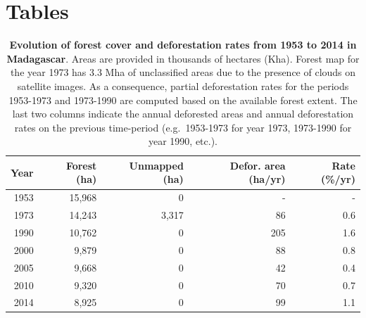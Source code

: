 \documentclass[a4paper, 12pt, leqno]{article} %
\begin{document}
\newpage

\section{Tables}
\label{tables}

\nopagebreak

\vfill
\begin{table}[!h]
  \begin{longtable}[]{@{}rrrrr@{}}
    \toprule
    Year & Forest (ha) & Unmapped (ha) & Defor. area (ha/yr) & Rate
    (\%/yr) \\
    \midrule
    \endhead
    1953 & 15,968 & 0 & - & - \\
    1973 & 14,243 & 3,317 & 86 & 0.6 \\
    1990 & 10,762 & 0 & 205 & 1.6 \\
    2000 & 9,879 & 0 & 88 & 0.8 \\
    2005 & 9,668 & 0 & 42 & 0.4 \\
    2010 & 9,320 & 0 & 70 & 0.7 \\
    2014 & 8,925 & 0 & 99 & 1.1 \\
    \bottomrule
  \end{longtable}
  \addtocounter{table}{-1}

  \caption{\textbf{Evolution of forest cover and deforestation rates
      from 1953 to 2014 in Madagascar}. Areas are provided in
    thousands of hectares (Kha). Forest map for the year 1973 has 3.3
    Mha of unclassified areas due to the presence of clouds on
    satellite images. As a consequence, partial deforestation rates
    for the periods 1953-1973 and 1973-1990 are computed based on the
    available forest extent. The last two columns indicate the annual
    deforested areas and annual deforestation rates on the previous
    time-period (e.g.~1953-1973 for year 1973, 1973-1990 for year
    1990, etc.).}

  \label{tab:forest_cover}
\end{table}
\vfill

\newpage
\end{document}
